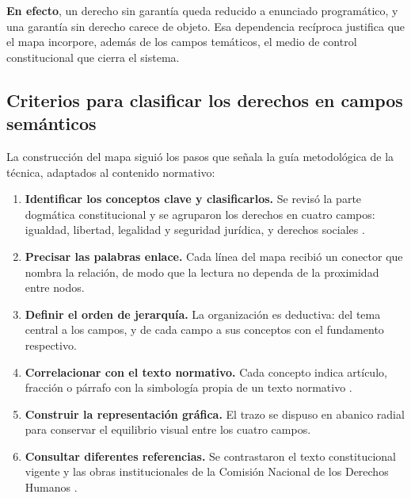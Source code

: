 \documentclass[
  spanish,
  letterpaper, oneside
]{article}
\begin{document}
\textbf{En efecto}, un derecho sin garantía queda reducido a enunciado programático, y una garantía sin derecho carece de objeto. Esa dependencia recíproca justifica que el mapa incorpore, además de los campos temáticos, el medio de control constitucional que cierra el sistema.

\subsection{Criterios para clasificar los derechos en campos semánticos}

La construcción del mapa siguió los pasos que señala la guía metodológica de la técnica, adaptados al contenido normativo:

\begin{enumerate}
  \item \textbf{Identificar los conceptos clave y clasificarlos.} Se revisó la parte dogmática constitucional y se agruparon los derechos en cuatro campos: igualdad, libertad, legalidad y seguridad jurídica, y derechos sociales \citep{cndhCualesDerechos2026}.
  \item \textbf{Precisar las palabras enlace.} Cada línea del mapa recibió un conector que nombra la relación, de modo que la lectura no dependa de la proximidad entre nodos.
  \item \textbf{Definir el orden de jerarquía.} La organización es deductiva: del tema central a los campos, y de cada campo a sus conceptos con el fundamento respectivo.
  \item \textbf{Correlacionar con el texto normativo.} Cada concepto indica artículo, fracción o párrafo con la simbología propia de un texto normativo \citep{cpeum2026}.
  \item \textbf{Construir la representación gráfica.} El trazo se dispuso en abanico radial para conservar el equilibrio visual entre los cuatro campos.
  \item \textbf{Consultar diferentes referencias.} Se contrastaron el texto constitucional vigente y las obras institucionales de la Comisión Nacional de los Derechos Humanos \citep{cndhInehrmArticulo1o2015}.
\end{enumerate}
\end{document}
